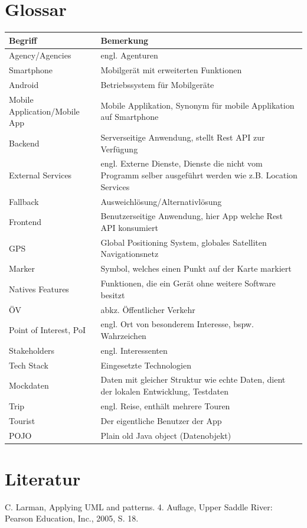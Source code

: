 \documentclass[a4paper,10pt,xetex]{article}
\begin{document}
\section{Glossar}\label{glossar}
\begin{longtabu} to \textwidth { | l | X[l] | }
\hline
\textbf{Begriff} & \textbf{Bemerkung}\\\hline
\endhead

Agency/Agencies & engl. Agenturen\\\hline
Smartphone & Mobilgerät mit erweiterten Funktionen\\\hline
Android & Betriebssystem für Mobilgeräte\\\hline
Mobile Application/Mobile App & Mobile Applikation, Synonym für mobile Applikation auf Smartphone\\\hline
Backend & Serverseitige Anwendung, stellt Rest API zur Verfügung\\\hline
External Services & engl. Externe Dienste, Dienste die nicht vom Programm selber ausgeführt werden wie z.B. Location Services\\\hline
Fallback & Ausweichlösung/Alternativlösung\\\hline
Frontend & Benutzerseitige Anwendung, hier App welche Rest API konsumiert\\\hline
GPS & Global Positioning System, globales Satelliten Navigationsnetz\\\hline
Marker & Symbol, welches einen Punkt auf der Karte markiert\\\hline
Natives Features & Funktionen, die ein Gerät ohne weitere Software besitzt\\\hline
ÖV & abkz. Öffentlicher Verkehr\\\hline
Point of Interest, PoI & engl. Ort von besonderem Interesse, bspw. Wahrzeichen\\\hline
Stakeholders & engl. Interessenten\\\hline
Tech Stack & Eingesetzte Technologien\\\hline
Mockdaten & Daten mit gleicher Struktur wie echte Daten, dient der lokalen Entwicklung, Testdaten \\\hline
Trip & engl. Reise, enthält mehrere Touren\\\hline
Tourist & Der eigentliche Benutzer der App\\\hline
POJO & Plain old Java object (Datenobjekt)\\\hline
\end{longtabu}


\section{Literatur}\label{literatur}
\begingroup
\renewcommand{\section}[2]{}%
  \begin{thebibliography}{9}
     C. Larman, Applying UML and patterns. 4. Auflage, Upper Saddle River: Pearson Education, Inc., 2005, S. 18.
  \end{thebibliography}
\endgroup
\end{document}
